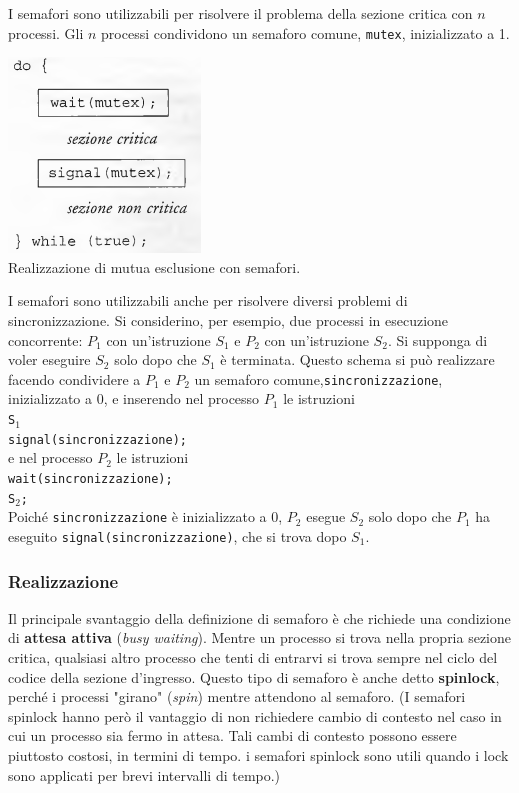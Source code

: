 \documentclass[11pt,a4paper]{article}
\begin{document}
I semafori sono utilizzabili per risolvere il problema della sezione critica con $n$ processi. Gli $n$ processi condividono un semaforo comune, \texttt{mutex}, inizializzato a 1.
\begin{center}
  \includegraphics[scale=0.6]{img/0030.png}\\
  \caption{Realizzazione di mutua esclusione con semafori.}
\end{center}
%
I semafori sono utilizzabili anche per risolvere diversi problemi di sincronizzazione. Si
considerino, per esempio, due processi in esecuzione concorrente: $P_1$ con un'istruzione $S_1$ e
$P_2$ con un'istruzione $S_2$. Si supponga di voler eseguire $S_2$ solo dopo che $S_1$ è terminata.
Questo schema si può realizzare facendo condividere a $P_1$ e $P_2$ un semaforo comune,\texttt{sincronizzazione}, inizializzato a 0, e inserendo nel processo $P_1$ le istruzioni\medskip\\
\texttt{S$_1$\\
        signal(sincronizzazione);}\medskip\\
e nel processo $P_2$ le istruzioni\medskip\\
\texttt{wait(sincronizzazione);\\
        S$_2$;}\medskip\\
%
Poiché \texttt{sincronizzazione} è inizializzato a 0, $P_2$ esegue $S_2$ solo dopo che $P_1$ ha eseguito
\texttt{signal(sincronizzazione)}, che si trova dopo $S_1$.

\subsubsection{Realizzazione}
Il principale svantaggio della definizione di semaforo è che richiede una condizione di \textbf{atte­sa attiva} (\emph{busy waiting}). Mentre un processo si trova nella propria sezione critica, qualsiasi
altro processo che tenti di entrarvi si trova sempre nel ciclo del codice della sezione d'ingres­so. Questo tipo di semaforo è anche detto \textbf{spinlock},
perché i processi "girano" (\emph{spin}) mentre attendono al semaforo. (I semafori spinlock hanno
però il vantaggio di non richiedere cambio di contesto nel caso in cui un processo sia fermo
in attesa. Tali cambi di contesto possono essere piuttosto costosi, in termini di tempo.
i semafori spinlock sono utili quando i lock sono applicati per brevi intervalli
di tempo.)
\end{document}
